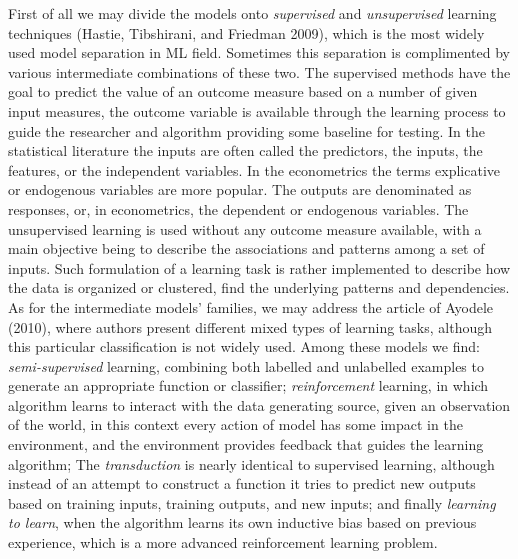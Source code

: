 \documentclass[12pt,]{article}
\begin{document}
First of all we may divide the models onto \emph{supervised} and
\emph{unsupervised} learning techniques (Hastie, Tibshirani, and
Friedman 2009), which is the most widely used model separation in ML
field. Sometimes this separation is complimented by various intermediate
combinations of these two. The supervised methods have the goal to
predict the value of an outcome measure based on a number of given input
measures, the outcome variable is available through the learning process
to guide the researcher and algorithm providing some baseline for
testing. In the statistical literature the inputs are often called the
predictors, the inputs, the features, or the independent variables. In
the econometrics the terms explicative or endogenous variables are more
popular. The outputs are denominated as responses, or, in econometrics,
the dependent or endogenous variables. The unsupervised learning is used
without any outcome measure available, with a main objective being to
describe the associations and patterns among a set of inputs. Such
formulation of a learning task is rather implemented to describe how the
data is organized or clustered, find the underlying patterns and
dependencies. As for the intermediate models' families, we may address
the article of Ayodele (2010), where authors present different mixed
types of learning tasks, although this particular classification is not
widely used. Among these models we find: \emph{semi-supervised}
learning, combining both labelled and unlabelled examples to generate an
appropriate function or classifier; \emph{reinforcement} learning, in
which algorithm learns to interact with the data generating source,
given an observation of the world, in this context every action of model
has some impact in the environment, and the environment provides
feedback that guides the learning algorithm; The \emph{transduction} is
nearly identical to supervised learning, although instead of an attempt
to construct a function it tries to predict new outputs based on
training inputs, training outputs, and new inputs; and finally
\emph{learning to learn}, when the algorithm learns its own inductive
bias based on previous experience, which is a more advanced
reinforcement learning problem.
\end{document}
